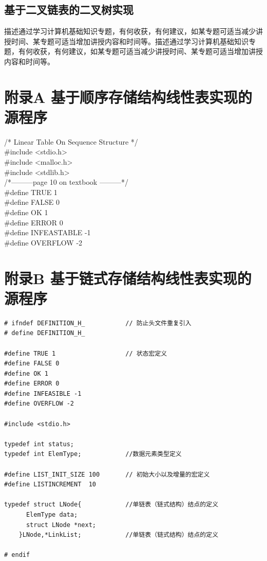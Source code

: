 \documentclass[supercite]{Experimental_Report}
\theoremstyle{definition}
\begin{document}
\subsection{基于二叉链表的二叉树实现}

描述通过学习计算机基础知识专题，有何收获，有何建议，如某专题可适当减少讲授时间、某专题可适当增加讲授内容和时间等。描述通过学习计算机基础知识专题，有何收获，有何建议，如某专题可适当减少讲授时间、某专题可适当增加讲授内容和时间等。


\nocite{*} %



\setcounter{secnumdepth}{0}
\appendix


\section{附录A 基于顺序存储结构线性表实现的源程序}

\noindent
/* Linear Table On Sequence Structure */\\
\#include <stdio.h>\\
\#include <malloc.h>\\
\#include <stdlib.h>\\

\noindent
/*---------page 10 on textbook ---------*/\\
\#define TRUE 1\\
\#define FALSE 0\\
\#define OK 1\\
\#define ERROR 0\\
\#define INFEASTABLE -1\\
\#define OVERFLOW -2\\
\newpage

\section{附录B 基于链式存储结构线性表实现的源程序}



\noindent

\begin{lstlisting}[title = Definition.h]
# ifndef DEFINITION_H_           // 防止头文件重复引入
# define DEFINITION_H_

#define TRUE 1                   // 状态宏定义 
#define FALSE 0
#define OK 1
#define ERROR 0
#define INFEASIBLE -1
#define OVERFLOW -2

#include <stdio.h>

typedef int status;
typedef int ElemType;            //数据元素类型定义

#define LIST_INIT_SIZE 100       // 初始大小以及增量的宏定义
#define LISTINCREMENT  10

typedef struct LNode{            //单链表（链式结构）结点的定义
	  ElemType data;
	  struct LNode *next;
	}LNode,*LinkList;            //单链表（链式结构）结点的定义

# endif	
\end{lstlisting}
\end{document}
